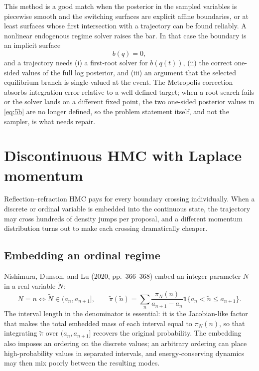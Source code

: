 \documentclass[11pt]{article}
\begin{document}
This method is a good match when the posterior in the sampled variables is
piecewise smooth and the switching surfaces are explicit affine boundaries,
or at least surfaces whose first intersection with a trajectory can be found
reliably. A nonlinear endogenous regime solver raises the bar. In that case
the boundary is an implicit surface
\begin{equation}\label{eq:61}
 b(q)=0,
\end{equation}
and a trajectory needs (i) a first-root solver for $b(q(t))$, (ii) the
correct one-sided values of the full log posterior, and (iii) an argument
that the selected equilibrium branch is single-valued at the event. The
Metropolis correction absorbs integration error relative to a well-defined
target; when a root search fails or the solver lands on a different fixed
point, the two one-sided posterior values in \eqref{eq:5b} are no longer
defined, so the problem statement itself, and not the sampler, is what needs
repair.

\section{Discontinuous HMC with Laplace momentum}\label{sec:dhmc}

Reflection--refraction HMC pays for every boundary crossing individually.
When a discrete or ordinal variable is embedded into the continuous state,
the trajectory may cross hundreds of density jumps per proposal, and a
different momentum distribution turns out to make each crossing dramatically
cheaper.

\subsection{Embedding an ordinal regime}\label{sec:dhmc-embed}

Nishimura, Dunson, and Lu (2020, pp.~366--368) embed an integer parameter $N$
in a real variable $\widetilde N$:
\begin{equation}\label{eq:62}
 N=n \iff \widetilde N\in(a_n,a_{n+1}],\qquad
 \widetilde\pi(\widetilde n)=
 \sum_n\frac{\pi_N(n)}{a_{n+1}-a_n}
 \mathbf 1\{a_n<\widetilde n\leq a_{n+1}\}.
\end{equation}
The interval length in the denominator is essential: it is the Jacobian-like
factor that makes the total embedded mass of each interval equal to
$\pi_N(n)$, so that integrating $\widetilde\pi$ over $(a_n,a_{n+1}]$ recovers
the original probability. The embedding also imposes an ordering on the
discrete values; an arbitrary ordering can place high-probability values in
separated intervals, and energy-conserving dynamics may then mix poorly
between the resulting modes.
\end{document}
